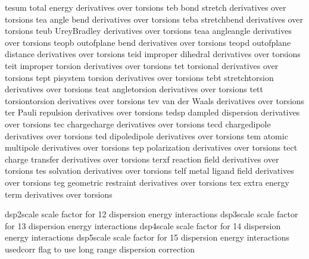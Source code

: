 \documentclass[letterpaper,11pt,english]{sphinxmanual}
\begin{document}
\begin{sphinxVerbatim}[commandchars=\\\{\}]
tesum           total energy derivatives over torsions
teb             bond stretch derivatives over torsions
tea             angle bend derivatives over torsions
teba            stretch\PYGZhy{}bend derivatives over torsions
teub            Urey\PYGZhy{}Bradley derivatives over torsions
teaa            angle\PYGZhy{}angle derivatives over torsions
teopb           out\PYGZhy{}of\PYGZhy{}plane bend derivatives over torsions
teopd           out\PYGZhy{}of\PYGZhy{}plane distance derivatives over torsions
teid            improper dihedral derivatives over torsions
teit            improper torsion derivatives over torsions
tet             torsional derivatives over torsions
tept            pi\PYGZhy{}system torsion derivatives over torsions
tebt            stretch\PYGZhy{}torsion derivatives over torsions
teat            angle\PYGZhy{}torsion derivatives over torsions
tett            torsion\PYGZhy{}torsion derivatives over torsions
tev             van der Waals derivatives over torsions
ter             Pauli repulsion derivatives over torsions
tedsp           dampled dispersion derivatives over torsions
tec             charge\PYGZhy{}charge derivatives over torsions
tecd            charge\PYGZhy{}dipole derivatives over torsions
ted             dipole\PYGZhy{}dipole derivatives over torsions
tem             atomic multipole derivatives over torsions
tep             polarization derivatives over torsions
tect            charge transfer derivatives over torsions
terxf           reaction field derivatives over torsions
tes             solvation derivatives over torsions
telf            metal ligand field derivatives over torsions
teg             geometric restraint derivatives over torsions
tex             extra energy term derivatives over torsions
\end{sphinxVerbatim}


\begin{sphinxVerbatim}[commandchars=\\\{\}]
dsp2scale       scale factor for 1\PYGZhy{}2 dispersion energy interactions
dsp3scale       scale factor for 1\PYGZhy{}3 dispersion energy interactions
dsp4scale       scale factor for 1\PYGZhy{}4 dispersion energy interactions
dsp5scale       scale factor for 1\PYGZhy{}5 dispersion energy interactions
use\PYGZus{}dcorr       flag to use long range dispersion correction
\end{sphinxVerbatim}
\end{document}
